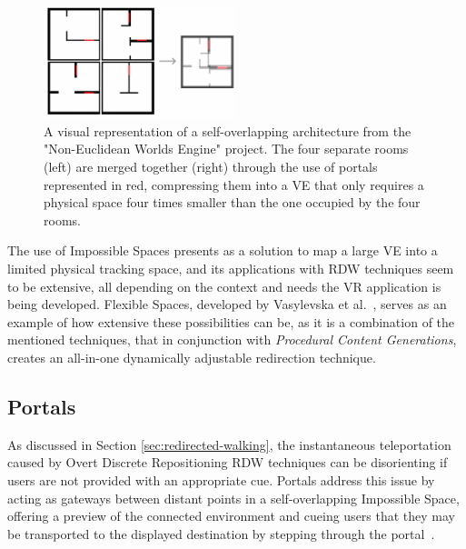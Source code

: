 \begin{figure}[t]
   \centering
    \includegraphics[width=0.5\textwidth]{NOVAthesisFiles/Images/papers/self-overlapping.png}
    \caption[Illustration of a Self-Overlapping Architecture]{A visual representation of a self-overlapping architecture from the "Non-Euclidean Worlds Engine" project.
    The four separate rooms (left) are merged together (right) through the use of portals represented in red, compressing them into a 
    \gls{VE} that only requires a physical space four times smaller than the one occupied by the four rooms.}
   \label{fig:self-Overlapping}
\end{figure}

The use of Impossible Spaces presents as a solution to map a large \gls{VE} into a limited physical tracking space, and its applications 
with \gls{RDW} techniques seem to be extensive, all depending on the context and needs the \gls{VR} application is being developed.
Flexible Spaces, developed by Vasylevska et al.~\cite{6550194}, serves as an example of how extensive these possibilities can be,
as it is a combination of the mentioned techniques, that in conjunction with \textit{Procedural Content Generations}, 
creates an all-in-one dynamically adjustable redirection technique. 


\subsection{Portals}
\label{sec:portals}

As discussed in Section \ref{sec:redirected-walking}, the instantaneous teleportation caused by Overt Discrete Repositioning 
\gls{RDW} techniques can be disorienting if users are not provided with an appropriate cue. Portals address this issue by 
acting as gateways between distant points in a self-overlapping Impossible Space, offering a preview of the connected environment 
and cueing users that they may be transported to the displayed destination by stepping through the portal~\cite{Freitag2014,Jaksties2022,Liu2018b,Lochner2021}.

